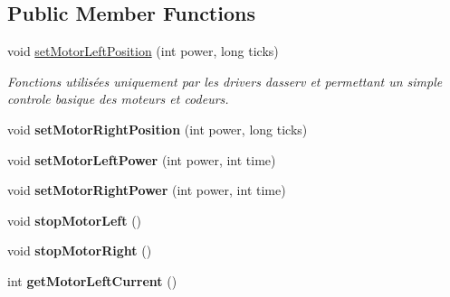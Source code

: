 \subsection*{Public Member Functions}
\begin{DoxyCompactItemize}
\item 
\mbox{\label{classAsservDriver__mbed__i2c_ae872042bdbab54e86d1ab79ab14e323a}} 
void \hyperlink{classAsservDriver__mbed__i2c_ae872042bdbab54e86d1ab79ab14e323a}{set\+Motor\+Left\+Position} (int power, long ticks)
\begin{DoxyCompactList}\small\item\em Fonctions utilisées uniquement par les drivers d\textquotesingle{}asserv et permettant un simple controle basique des moteurs et codeurs. \end{DoxyCompactList}\item 
\mbox{\label{classAsservDriver__mbed__i2c_a60a05572f4f896944b5edd8e25153f2e}} 
void {\bfseries set\+Motor\+Right\+Position} (int power, long ticks)
\item 
\mbox{\label{classAsservDriver__mbed__i2c_a5fab36e24264760545808a011d191a76}} 
void {\bfseries set\+Motor\+Left\+Power} (int power, int time)
\item 
\mbox{\label{classAsservDriver__mbed__i2c_aa13d8dc0775b605d6a19d633bc17d1c3}} 
void {\bfseries set\+Motor\+Right\+Power} (int power, int time)
\item 
\mbox{\label{classAsservDriver__mbed__i2c_a77b3fd174cf2f34d8acf8a4a59a12078}} 
void {\bfseries stop\+Motor\+Left} ()
\item 
\mbox{\label{classAsservDriver__mbed__i2c_acb4396842a245a9d39ff44e45a76d7f0}} 
void {\bfseries stop\+Motor\+Right} ()
\item 
\mbox{\label{classAsservDriver__mbed__i2c_aac1f236220a7f1946c2fd76948b3b49e}} 
int {\bfseries get\+Motor\+Left\+Current} ()
\item 
\mbox{\label{classAsservDriver__mbed__i2c_a654abde259d6169d89590f8038d3d23b}} 

\end{DoxyCompactItemize}
